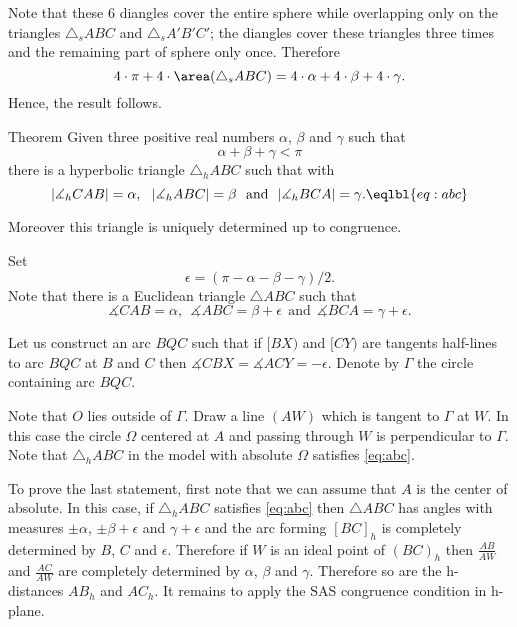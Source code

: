 {Note that these 6 diangles cover the entire sphere while overlapping
only on the triangles $\triangle_s ABC$ and $\triangle_s A'B'C'$;
the diangles cover these triangles three times and the remaining part of sphere only once.
Therefore 
$$
4\cdot\pi + 4\cdot\area(\triangle_s ABC)= 4\cdot \alpha+4\cdot \beta+4\cdot\gamma.
$$
Hence, the result follows.
\qeds













\begin{thm}{Theorem}\label{thm:sum-trig-h}
Given three positive real numbers $\alpha$, $\beta$ and $\gamma$ such that
$$\alpha+\beta+\gamma<\pi$$ 
there is a hyperbolic triangle $\triangle_hABC$
such that with
$$|\measuredangle_hCAB|=\alpha,\ \ |\measuredangle_hABC|=\beta\ \ \text{and}\ \ |\measuredangle_hBCA|=\gamma.\eqlbl{eq:abc}$$
 
Moreover this triangle is uniquely determined up to congruence. 
\end{thm}


Set 
$$\epsilon=(\pi-\alpha-\beta-\gamma)/2.$$
Note that there is a Euclidean triangle $\triangle ABC$ such that 
$$\measuredangle CAB=\alpha,\ \ \measuredangle ABC=\beta+\epsilon\ \ \text{and}\ \ \measuredangle BCA=\gamma+\epsilon.$$

Let us construct an arc $BQC$
such that if $[BX)$ and $[CY)$ are tangents half-lines to arc $BQC$
at $B$ and $C$ then $\measuredangle CBX=\measuredangle ACY=-\epsilon$.
Denote by $\Gamma$ the circle containing arc $BQC$.

Note that $O$ lies outside of $\Gamma$.
Draw a line $(AW)$ which is tangent to $\Gamma$ at $W$.
In this case the circle $\Omega$ centered at $A$  and passing through $W$
is perpendicular to $\Gamma$.
Note that $\triangle_h ABC$ in the model with absolute $\Omega$ satisfies \ref{eq:abc}. 

To prove the last statement, first note that we can assume that $A$ is the center of absolute.
In this case, if $\triangle_hABC$ satisfies \ref{eq:abc}
then $\triangle ABC$ has angles with measures 
$\pm \alpha$, $\pm \beta+\epsilon$ and $\gamma+\epsilon$
and the arc forming $[BC]_h$ is completely determined by  $B$, $C$ and $\epsilon$.
Therefore if $W$ is an ideal point of $(BC)_h$ then $\tfrac {AB}{AW}$ and $\tfrac {AC}{AW}$ are completely determined by $\alpha$, $\beta$ and $\gamma$.
Therefore so are the h-distances $AB_h$ and $AC_h$. 
It remains to apply the SAS congruence condition in h-plane.
\qeds












}
